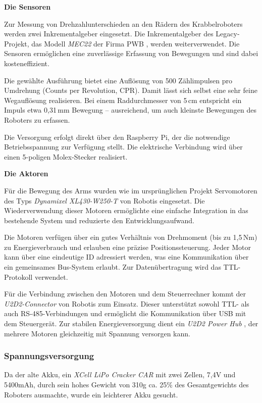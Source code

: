 \textbf{Die Sensoren}

Zur Messung von Drehzahlunterschieden an den Rädern des Krabbelroboters werden zwei Inkrementalgeber eingesetzt. Die Inkrementalgeber des Legacy-Projekt, das Modell \textit{MEC22} der Firma PWB \cite{pwb_me16_datasheet_2011}, werden weiterverwendet. Die Sensoren ermöglichen eine zuverlässige Erfassung von Bewegungen und sind dabei kosteneffizient.

Die gewählte Ausführung bietet eine Auflösung von 500 Zählimpulsen pro Umdrehung (Counts per Revolution, CPR). Damit lässt sich selbst eine sehr feine Wegauflösung realisieren. Bei einem Raddurchmesser von 5\,cm entspricht ein Impuls etwa 0{,}31\,mm Bewegung – ausreichend, um auch kleinste Bewegungen des Roboters zu erfassen.

Die Versorgung erfolgt direkt über den Raspberry Pi, der die notwendige Betriebsspannung zur Verfügung stellt. Die elektrische Verbindung wird über einen 5-poligen Molex-Stecker realisiert.

\textbf{Die Aktoren}

Für die Bewegung des Arms wurden wie im ursprünglichen Projekt Servomotoren des Typs \textit{Dynamixel XL430-W250-T} von Robotis \cite{robotis_xl430} eingesetzt. Die Wiederverwendung dieser Motoren ermöglichte eine einfache Integration in das bestehende System und reduzierte den Entwicklungsaufwand. 

Die Motoren verfügen über ein gutes Verhältnis von Drehmoment (bis zu 1{,}5\,Nm) zu Energieverbrauch und erlauben eine präzise Positionssteuerung. Jeder Motor kann über eine eindeutige ID adressiert werden, was eine Kommunikation über ein gemeinsames Bus-System erlaubt. Zur Datenübertragung wird das TTL-Protokoll verwendet.

Für die Verbindung zwischen den Motoren und dem Steuerrechner kommt der \textit{U2D2-Connector} von Robotis \cite{robotis_u2d2} zum Einsatz. Dieser unterstützt sowohl TTL- als auch RS-485-Verbindungen und ermöglicht die Kommunikation über USB mit dem Steuergerät. Zur stabilen Energieversorgung dient ein \textit{U2D2 Power Hub} \cite{robotis_u2d2_power_hub}, der mehrere Motoren gleichzeitig mit Spannung versorgen kann.


\subsubsection{Spannungsversorgung}

Da der alte Akku, ein \textit{XCell LiPo Cracker CAR} \cite{xcell_akku} mit zwei Zellen, 7,4V und 5400mAh, durch sein hohes Gewicht von 310g ca. 25\% des Gesamtgewichts des Roboters ausmachte, wurde ein leichterer Akku gesucht.

